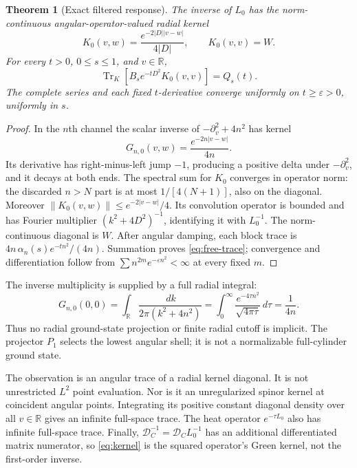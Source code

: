 \documentclass[11pt,letterpaper]{article}
\numberwithin{equation}{section}
\newtheorem{theorem}{Theorem}[section]
\theoremstyle{remark}
\DeclareMathOperator{\Tr}{Tr}
\newcommand{\R}{\mathbb R}
\newcommand{\dd}{\,d}
\newcommand{\dc}{\mathcal D_C}
\begin{document}
\begin{theorem}[Exact filtered response]\label{thm:free}
The inverse of \(L_0\) has the norm-continuous
angular-operator-valued radial kernel
\begin{equation}
 K_0(v,w)=\frac{e^{-2|D||v-w|}}{4|D|},\qquad K_0(v,v)=W.
 \label{eq:kernel}
\end{equation}
For every \(t>0\), \(0\le s\le1\), and \(v\in\R\),
\begin{equation}
 \Tr_K[B_s e^{-tD^2}K_0(v,v)]=Q_s(t).
 \label{eq:free-trace}
\end{equation}
The complete series and each fixed \(t\)-derivative converge uniformly
on \(t\ge\varepsilon>0\), uniformly in \(s\).
\end{theorem}
\begin{proof}
In the \(n\)th channel the scalar inverse of
\(-\partial_v^2+4n^2\) has kernel
\[
 G_{n,0}(v,w)=\frac{e^{-2n|v-w|}}{4n}.
\]
Its derivative has right-minus-left jump \(-1\), producing a
positive delta under \(-\partial_v^2\), and it decays at both ends.
The spectral sum for \(K_0\) converges in operator norm: the discarded
\(n>N\) part is at most \(1/[4(N+1)]\), also on the diagonal.
Moreover \(\|K_0(v,w)\|\le e^{-2|v-w|}/4\). Its convolution operator
is bounded and has Fourier multiplier \((k^2+4D^2)^{-1}\), identifying
it with \(L_0^{-1}\). The norm-continuous diagonal is \(W\).
After angular damping, each block trace is
\(4n\,\alpha_n(s)e^{-tn^2}/(4n)\). Summation proves
\eqref{eq:free-trace}; convergence and differentiation follow from
\(\sum n^{2m}e^{-\varepsilon n^2}<\infty\) at every fixed \(m\).
\end{proof}

The inverse multiplicity is supplied by a full radial integral:
\begin{equation}
 G_{n,0}(0,0)
 =\int_\R\frac{\dd k}{2\pi(k^2+4n^2)}
 =\int_0^\infty\frac{e^{-4\tau n^2}}{\sqrt{4\pi\tau}}\dd\tau
 =\frac1{4n}.
 \label{eq:proper-time}
\end{equation}
Thus no radial ground-state projection or finite radial cutoff is
implicit. The projector \(P_1\) selects the lowest angular shell;
it is not a normalizable full-cylinder ground state.

The observation is an angular trace of a radial kernel diagonal.
It is not unrestricted \(L^2\) point evaluation. Nor is it an
unregularized spinor kernel at coincident angular points.
Integrating its positive constant diagonal density over all
\(v\in\R\) gives an infinite full-space trace. The heat operator
\(e^{-\tau L_0}\) also has infinite full-space trace.
Finally, \(\dc^{-1}=\dc L_0^{-1}\) has an additional differentiated
matrix numerator, so \eqref{eq:kernel} is the squared operator's
Green kernel, not the first-order inverse.
\end{document}

